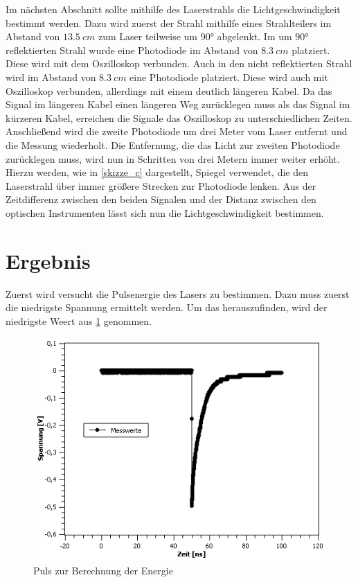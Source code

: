 \documentclass[
	a4paper,
	12pt,
	pagesize,
	ngerman
]{scrartcl}
\begin{document}
Im nächsten Abschnitt sollte mithilfe des Laserstrahls die Lichtgeschwindigkeit bestimmt werden. Dazu wird zuerst der Strahl mithilfe eines Strahlteilers im Abstand von $\SI{13,5}{cm}$ zum Laser teilweise um $90$° abgelenkt. Im um $90$° reflektierten Strahl wurde eine Photodiode im Abstand von $\SI{8,3}{cm}$ platziert. Diese wird mit dem Oszilloskop verbunden. Auch in den nicht reflektierten Strahl wird im Abstand von $\SI{8,3}{cm}$ eine Photodiode platziert. Diese wird auch mit Oszilloskop verbunden, allerdings mit einem deutlich längeren Kabel. Da das Signal im längeren Kabel einen längeren Weg zurücklegen muss als das Signal im kürzeren Kabel, erreichen die Signale das Oszilloskop zu unterschiedlichen Zeiten.
Anschließend wird die zweite Photodiode um drei Meter vom Laser entfernt und die Messung wiederholt. Die Entfernung, die das Licht zur zweiten Photodiode zurücklegen muss, wird nun in Schritten von drei Metern immer weiter erhöht. Hierzu werden, wie in \cref{skizze_c} dargestellt, Spiegel verwendet, die den Laserstrahl über immer größere Strecken zur Photodiode lenken.
Aus der Zeitdifferenz zwischen den beiden Signalen und der Distanz zwischen den optischen Instrumenten lässt sich nun die Lichtgeschwindigkeit bestimmen.

\section{Ergebnis}
Zuerst wird versucht die Pulsenergie des Lasers zu bestimmen. Dazu muss zuerst die niedrigste Spannung ermittelt werden. Um das herauszufinden, wird der niedrigste Weert aus \cref{Energie} genommen. 

\begin{figure}[h!]
	\centering
	\includegraphics[scale=0.7]{Energie.png}
	\caption{Puls zur Berechnung der Energie}
	\label{Energie}
\end{figure}
\end{document}
